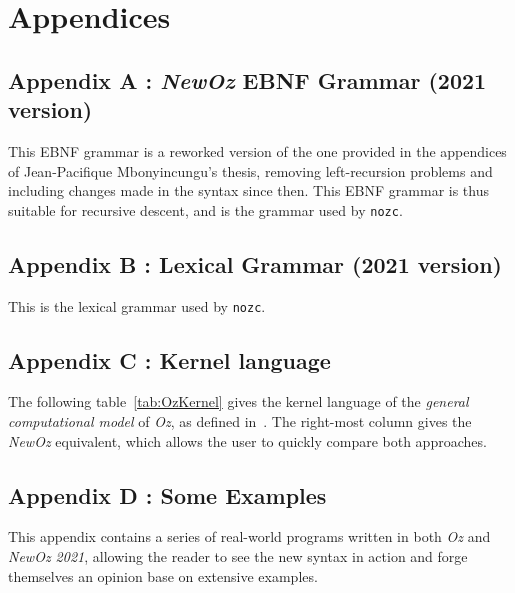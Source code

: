 \appendix
\chapter*{Appendices}
\renewcommand{\thesection}{\Alph{section}}

\section{Appendix A : \textit{NewOz} EBNF Grammar (2021 version)}\label{sec:appendix-grammar}
This EBNF grammar is a reworked version of the one provided in the appendices of Jean-Pacifique Mbonyincungu's thesis,
removing left-recursion problems and including changes made in the syntax since then.\newline
This EBNF grammar is thus suitable for recursive descent, and is the grammar used by \texttt{nozc}.


\section{Appendix B : Lexical Grammar (2021 version)}\label{sec:appendix-lexical-grammar}
This is the lexical grammar used by \texttt{nozc}.


\section{Appendix C : Kernel language}\label{sec:appendix-kernel}
The following table~\ref{tab:OzKernel} gives the kernel language of the \textit{general computational model} of \textit{Oz}, as defined in~\cite{van2004concepts}.
The right-most column gives the \textit{NewOz} equivalent, which allows the user to quickly compare both approaches.


\section{Appendix D : Some Examples}\label{sec:appendix-examples}
This appendix contains a series of real-world programs written in both \textit{Oz} and \textit{NewOz 2021}, allowing the reader to see the new syntax in action and forge themselves an opinion base on extensive examples.







